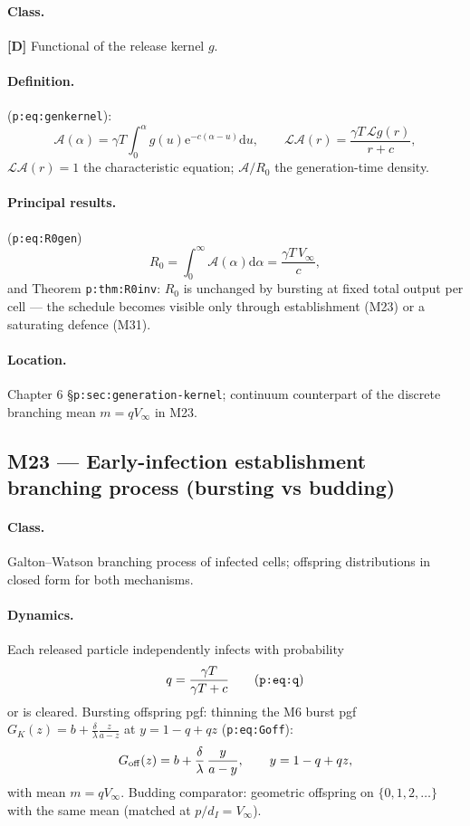\documentclass[11pt,a4paper]{article}
\newcommand{\ee}{\mathrm{e}}
\newcommand{\dd}{\mathrm{d}}
\newcommand{\Lap}{\mathcal{L}}      %
\begin{document}
\paragraph{Class.} \textbf{[D]} Functional of the release kernel $g$.

\paragraph{Definition.} (\texttt{p:eq:genkernel}):
\[
\mathcal A(\alpha)=\gamma T\int_0^\alpha g(u)\ee^{-c(\alpha-u)}\dd u,
\qquad \Lap{\mathcal A}(r)=\frac{\gamma T\,\Lap g(r)}{r+c},
\]
$\Lap{\mathcal A}(r)=1$ the characteristic equation; $\mathcal A/R_0$ the
generation-time density.

\paragraph{Principal results.} (\texttt{p:eq:R0gen})
\[
R_0=\int_0^\infty\mathcal A(\alpha)\dd\alpha
=\frac{\gamma T\,V_\infty}{c},
\]
and Theorem \texttt{p:thm:R0inv}: $R_0$ is unchanged by bursting at fixed
total output per cell --- the schedule becomes visible only through
establishment (M23) or a saturating defence (M31).

\paragraph{Location.} Chapter 6 \S\texttt{p:sec:generation-kernel};
continuum counterpart of the discrete branching mean $m=qV_\infty$ in M23.

\subsection{M23 --- Early-infection establishment branching process (bursting vs budding)}

\paragraph{Class.} Galton--Watson branching process of infected cells;
offspring distributions in closed form for both mechanisms.

\paragraph{Dynamics.} Each released particle independently infects with
probability
\[
q=\frac{\gamma T}{\gamma T+c}
\qquad\text{(\texttt{p:eq:q})}
\]
or is cleared. Bursting offspring pgf: thinning the M6 burst pgf
$G_K(z)=b+\frac{\delta}{\lambda}\frac z{a-z}$ at $y=1-q+qz$
(\texttt{p:eq:Goff}):
\[
G_{\rm off}(z)=b+\frac{\delta}{\lambda}\,\frac{y}{a-y},\qquad y=1-q+qz ,
\]
with mean $m=qV_\infty$. Budding comparator: geometric offspring on
$\{0,1,2,\ldots\}$ with the same mean (matched at $p/d_I=V_\infty$).
\end{document}
